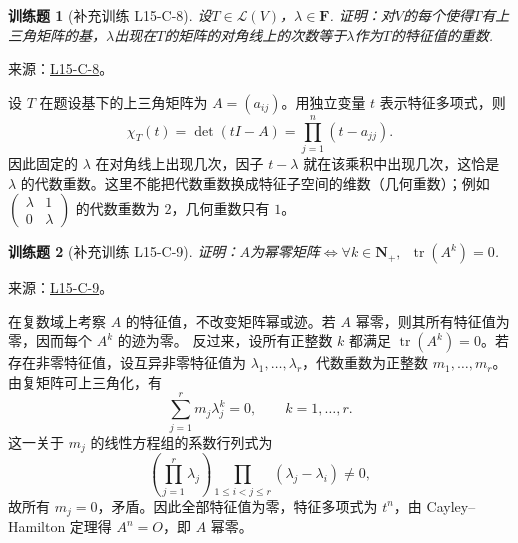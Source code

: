 \documentclass[12pt,fontset=fandol]{ctexart}
\newtheorem{exercise}{训练题}[section]
\begin{document}
\begin{exercise}[补充训练 L15-C-8]\label{prob:L15-C-8}
设$T\in \mathcal{L}(V)$，$\lambda\in\mathbf{F}$. 证明：对$V$的每个使得$T$有上三角矩阵的基，$\lambda$出现在$T$的矩阵的对角线上的次数等于$\lambda$作为$T$的特征值的重数.
\end{exercise}
\noindent 来源：\href{https://github.com/yhwu-is/Linear-Algebra-Left-Undone/blob/new/%E8%AE%B2%E4%B9%89/%E4%B8%93%E9%A2%98/15%20%E7%9B%B8%E4%BC%BC%E6%A0%87%E5%87%86%E5%BD%A2%EF%BC%9A%E5%A4%8D%E6%95%B0%E5%9F%9F%E4%B8%8A%E7%9A%84%E5%B0%9D%E8%AF%95%E4%B8%8E%E7%90%86%E8%AE%BA.tex}{L15-C-8}。
\begin{solve}
设 $T$ 在题设基下的上三角矩阵为 $A=(a_{ij})$。用独立变量 $t$ 表示特征多项式，则
\[\chi_T(t)=\det(tI-A)=\prod_{j=1}^n(t-a_{jj}).\]
因此固定的 $\lambda$ 在对角线上出现几次，因子 $t-\lambda$ 就在该乘积中出现几次，这恰是 $\lambda$ 的代数重数。这里不能把代数重数换成特征子空间的维数（几何重数）；例如 $\begin{pmatrix}\lambda&1\\0&\lambda\end{pmatrix}$ 的代数重数为 $2$，几何重数只有 $1$。
\end{solve}

\begin{exercise}[补充训练 L15-C-9]\label{prob:L15-C-9}
证明：$A$为幂零矩阵$\iff \forall k \in \mathbf{N}_+,\enspace\operatorname{tr}(A^k)=0$.
\end{exercise}
\noindent 来源：\href{https://github.com/yhwu-is/Linear-Algebra-Left-Undone/blob/new/%E8%AE%B2%E4%B9%89/%E4%B8%93%E9%A2%98/15%20%E7%9B%B8%E4%BC%BC%E6%A0%87%E5%87%86%E5%BD%A2%EF%BC%9A%E5%A4%8D%E6%95%B0%E5%9F%9F%E4%B8%8A%E7%9A%84%E5%B0%9D%E8%AF%95%E4%B8%8E%E7%90%86%E8%AE%BA.tex}{L15-C-9}。
\begin{solve}
在复数域上考察 $A$ 的特征值，不改变矩阵幂或迹。若 $A$ 幂零，则其所有特征值为零，因而每个 $A^k$ 的迹为零。
反过来，设所有正整数 $k$ 都满足 $\operatorname{tr}(A^k)=0$。若存在非零特征值，设互异非零特征值为 $\lambda_1,\ldots,\lambda_r$，代数重数为正整数 $m_1,\ldots,m_r$。由复矩阵可上三角化，有
\[\sum_{j=1}^r m_j\lambda_j^k=0,\qquad k=1,\ldots,r.\]
这一关于 $m_j$ 的线性方程组的系数行列式为
\[\left(\prod_{j=1}^r\lambda_j\right)\prod_{1\le i<j\le r}(\lambda_j-\lambda_i)\ne0,\]
故所有 $m_j=0$，矛盾。因此全部特征值为零，特征多项式为 $t^n$，由 Cayley--Hamilton 定理得 $A^n=O$，即 $A$ 幂零。
\end{solve}
\end{document}
